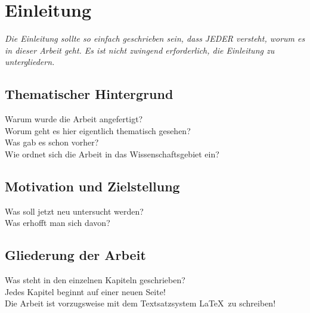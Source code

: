 %
%
\chapter{Einleitung}
{\em Die Einleitung sollte so einfach geschrieben sein, dass JEDER versteht, worum es in dieser Arbeit geht. Es ist nicht zwingend erforderlich, die Einleitung zu untergliedern.}
\section{Thematischer Hintergrund}
Warum wurde die Arbeit angefertigt?\\
Worum geht es hier eigentlich thematisch gesehen?\\
Was gab es schon vorher?\\
Wie ordnet sich die Arbeit in das Wissenschaftsgebiet ein?\\
\section{Motivation und Zielstellung}
Was soll jetzt neu untersucht werden?\\
Was erhofft man sich davon?\\
\section{Gliederung der Arbeit}
Was steht in den einzelnen Kapiteln geschrieben?\\
Jedes Kapitel beginnt auf einer neuen Seite!\\
Die Arbeit ist vorzugsweise mit dem Textsatzsystem \LaTeX\ zu schreiben!
